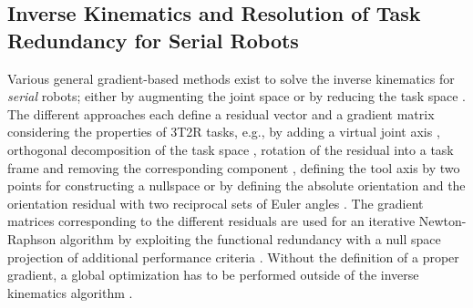 \documentclass[robotics,article,accept,moreauthors,pdftex]{Definitions/mdpi}
\begin{document}
\subsection{Inverse Kinematics and Resolution of Task Redundancy for Serial Robots}

Various general gradient-based methods exist to solve the inverse kinematics for \emph{serial} robots; either by augmenting the joint space \cite{Baron2000} or by reducing the task space \cite{HuoBar2005,Zlajpah2017,LegerAng2016,1_SchapplerTapOrt2019}.
The different approaches each define a residual vector and a gradient matrix considering the properties of 3T2R tasks, e.g., by adding a virtual joint axis \cite{Baron2000}, orthogonal decomposition of the task space \cite{HuoBar2005}, rotation of the residual into a task frame and removing the corresponding component \cite{Zlajpah2017}, defining the tool axis by two points for constructing a nullspace \cite{LegerAng2016} or by defining the absolute orientation and the orientation residual with two reciprocal sets of Euler angles \cite{1_SchapplerTapOrt2019}.
The gradient matrices corresponding to the different residuals are used for an iterative Newton-Raphson algorithm \cite{Yoshikawa1984,GoldenbergBenFen1985} by exploiting the functional redundancy with a null space projection of additional performance criteria \cite{Yoshikawa1984}.
Without the definition of a proper gradient, a global optimization has to be performed outside of the inverse kinematics algorithm \cite{ZhuQuCaoYan2013,GuoDonKe2015}.
\end{document}
